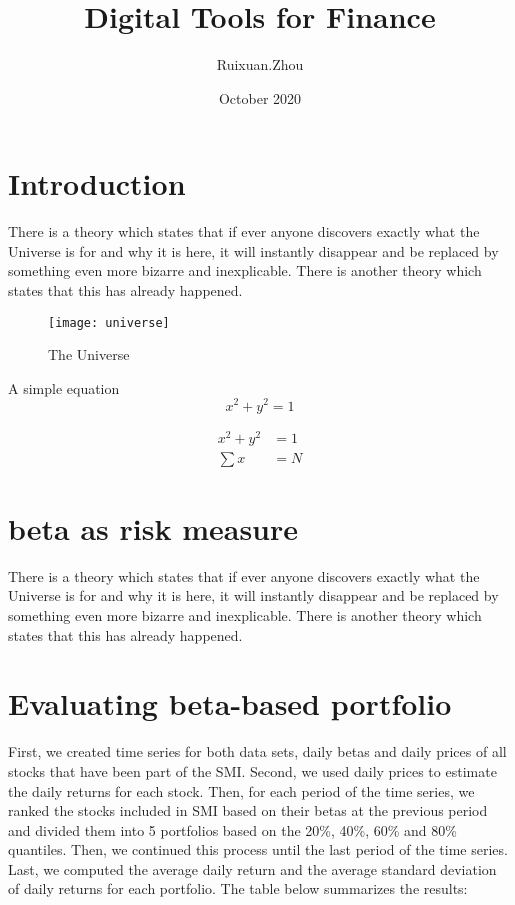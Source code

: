 \documentclass{article}
\title{Digital Tools for Finance}
\author{Ruixuan.Zhou }
\date{October 2020}
\begin{document}
\maketitle

\section{Introduction}
There is a theory which states that if ever anyone discovers exactly what the Universe is for and why it is here, it will instantly disappear and be replaced by something even more bizarre and inexplicable.
There is another theory which states that this has already happened.

\begin{figure}[h!]
\centering
\texttt{[image: universe]}
\caption{The Universe}
\label{fig:universe}
\end{figure}

A simple equation
\begin{equation}
    x^2+y^2=1
\end{equation}

\begin{align}
    x^2 + y^2 &=1  \\
    \sum x &= N
\end{align}

\section{beta as risk measure}
There is a theory which states that if ever anyone discovers exactly what the Universe is for and why it is here, it will instantly disappear and be replaced by something even more bizarre and inexplicable.
There is another theory which states that this has already happened.

\section{Evaluating beta-based portfolio}
First, we created time series for both data sets, daily betas and daily prices of all stocks that have been part of the SMI. Second, we used daily prices to estimate the daily returns for each stock. Then, for each period of the time series, we ranked the stocks included in SMI based on their betas at the previous period and divided them into 5 portfolios based on the 20\%, 40\%, 60\% and 80\% quantiles. Then, we continued this process until the last period of the time series. Last, we computed the average daily return and the average standard deviation of daily returns for each portfolio. The table below summarizes the results:
\end{document}
